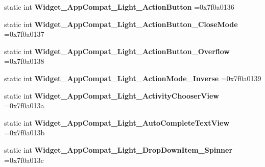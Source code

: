 \begin{DoxyCompactItemize}
\item 
\mbox{\label{classandroid_1_1support_1_1v7_1_1cardview_1_1R_1_1style_a059b9b2a2bf1eaea0c7f6b68215a227f}} 
static int {\bfseries Widget\+\_\+\+App\+Compat\+\_\+\+Light\+\_\+\+Action\+Button} =0x7f0a0136
\item 
\mbox{\label{classandroid_1_1support_1_1v7_1_1cardview_1_1R_1_1style_a9959bfc1e670523f8d9d0c7c523f4ea1}} 
static int {\bfseries Widget\+\_\+\+App\+Compat\+\_\+\+Light\+\_\+\+Action\+Button\+\_\+\+Close\+Mode} =0x7f0a0137
\item 
\mbox{\label{classandroid_1_1support_1_1v7_1_1cardview_1_1R_1_1style_af169225a297928ffcbb1d64227a798c4}} 
static int {\bfseries Widget\+\_\+\+App\+Compat\+\_\+\+Light\+\_\+\+Action\+Button\+\_\+\+Overflow} =0x7f0a0138
\item 
\mbox{\label{classandroid_1_1support_1_1v7_1_1cardview_1_1R_1_1style_a781d608e9033721b0d37ae9cd96f16ef}} 
static int {\bfseries Widget\+\_\+\+App\+Compat\+\_\+\+Light\+\_\+\+Action\+Mode\+\_\+\+Inverse} =0x7f0a0139
\item 
\mbox{\label{classandroid_1_1support_1_1v7_1_1cardview_1_1R_1_1style_aaaf5f11f5519aa31bd8b8c1f13acb786}} 
static int {\bfseries Widget\+\_\+\+App\+Compat\+\_\+\+Light\+\_\+\+Activity\+Chooser\+View} =0x7f0a013a
\item 
\mbox{\label{classandroid_1_1support_1_1v7_1_1cardview_1_1R_1_1style_a93adbd081e1bc3617891e7b94056fec0}} 
static int {\bfseries Widget\+\_\+\+App\+Compat\+\_\+\+Light\+\_\+\+Auto\+Complete\+Text\+View} =0x7f0a013b
\item 
\mbox{\label{classandroid_1_1support_1_1v7_1_1cardview_1_1R_1_1style_ad38e79c2ad51f9b67bac3909bf5aa571}} 
static int {\bfseries Widget\+\_\+\+App\+Compat\+\_\+\+Light\+\_\+\+Drop\+Down\+Item\+\_\+\+Spinner} =0x7f0a013c
\item 
\mbox{\label{classandroid_1_1support_1_1v7_1_1cardview_1_1R_1_1style_ae0a784bb8acaeaf29865efc2b500f6a1}} 

\end{DoxyCompactItemize}
